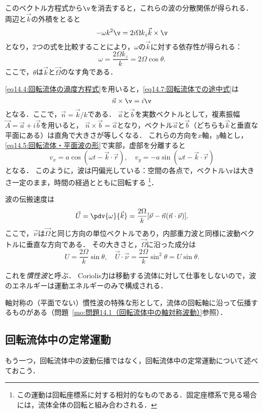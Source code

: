 このベクトル方程式から$\v$を消去すると，これらの波の分散関係が得られる．
両辺と$\vec{k}$の外積をとると
\[
    -\omega k^2 \v = 2i\Omega k_z \vec{k}\times\v
\]
となり，2つの式を比較することにより，$\omega$の$\vec{k}$に対する依存性が得られる：
\begin{equation}\label{eq14.8:回転流体の分散関係}
    \omega = \frac{2\Omega k_z}{k} = 2\Omega \cos\theta .
\end{equation} 
ここで，$\theta$は$\vec{k}$と$\vec{\Omega}$のなす角である．

\eqref{eq14.4:回転流体の渦度方程式}を用いると，\eqref{eq14.7:回転流体での途中式}は
\[
    \vec{n}\times\v = i\v
\]
となる．ここで，$\vec{n}= \vec{k}/k$である．
$\vec{a}$と$\vec{b}$を実数ベクトルとして，複素振幅$\vec{A} = \vec{a}+i\vec{b}$を用いると，
$\vec{n}\times\vec{b}=\vec{a}$となり，ベクトル$\vec{a}$と$\vec{b}$（どちらも$\vec{k}$と垂直な平面にある）は直角で大きさが等しくなる．
これらの方向を$x$軸，$y$軸とし，\eqref{eq14.5:回転流体・平面波の形}で実部，虚部を分離すると
\[
    v_x = a \cos(\omega t - \vec{k}\cdot\vec{r}), \quad
    v_y = -a \sin(\omega t - \vec{k}\cdot\vec{r})
\]
となる．
このように，波は円偏光している：空間の各点で，ベクトル$\v$は大きさ一定のまま，時間の経過とともに回転する
\footnote{この運動は回転座標系に対する相対的なものである．固定座標系で見る場合には，流体全体の回転と組み合わされる．}．


波の伝搬速度は
\begin{equation}
    \vec{U} = \pdv{\omega}{\vec{k}} = \frac{2\Omega}{k} [ \vec{\nu} - \vec{n}(\vec{n}\cdot\vec{\nu}) ] .
\end{equation}
ここで，$\vec{\nu}$は$\vec{\Omega}$と同じ方向の単位ベクトルであり，内部重力波と同様に波動ベクトルに垂直な方向である．
その大きさと，$\vec{\Omega}$に沿った成分は
\[
    U = \frac{2\Omega}{k} \sin\theta, \quad
    \vec{U}\cdot\vec{\nu} = \frac{2\Omega}{k}\sin^2\theta = U \sin\theta .
\]

これを\emph{慣性波}と呼ぶ．
Coriolis力は移動する流体に対して仕事をしないので，波のエネルギーは運動エネルギーのみで構成される．

軸対称の（平面でない）慣性波の特殊な形として，流体の回転軸に沿って伝播するものがある（問題~\ref{mo:問題14.1（回転流体中の軸対称波動）}参照）．


\subsection*{回転流体中の定常運動}
もう一つ，回転流体中の波動伝播ではなく，回転流体中の定常運動について述べておこう．

